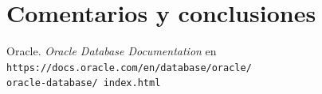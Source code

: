 \documentclass{article}
\begin{document}

\section*{Comentarios y conclusiones}


\renewcommand\refname{Bibliografía}
\begin{thebibliography}{99}
     Oracle. \textit{Oracle Database Documentation} en 
        \texttt{https://docs.oracle.com/en/database/oracle/\\oracle-database/%
        index.html}
\end{thebibliography}
\end{document}
